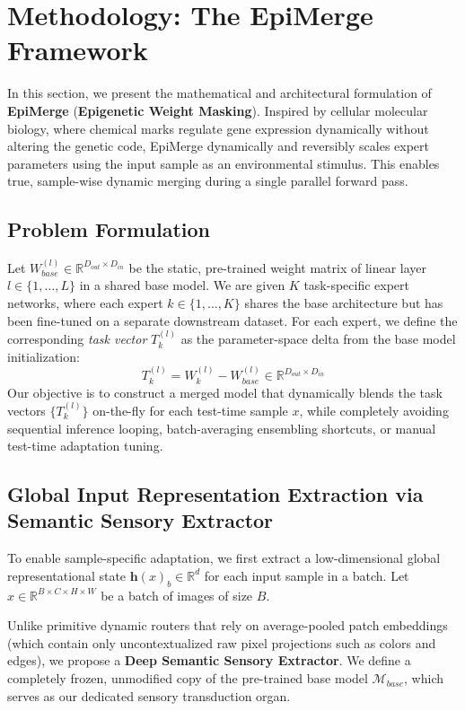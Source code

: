 \section{Methodology: The EpiMerge Framework}
\label{sec:method}

In this section, we present the mathematical and architectural formulation of \textbf{EpiMerge} (\textbf{Epigenetic Weight Masking}). Inspired by cellular molecular biology, where chemical marks regulate gene expression dynamically without altering the genetic code, EpiMerge dynamically and reversibly scales expert parameters using the input sample as an environmental stimulus. This enables true, sample-wise dynamic merging during a single parallel forward pass.

\subsection{Problem Formulation}
Let $W_{base}^{(l)} \in \mathbb{R}^{D_{out} \times D_{in}}$ be the static, pre-trained weight matrix of linear layer $l \in \{1, \dots, L\}$ in a shared base model. We are given $K$ task-specific expert networks, where each expert $k \in \{1, \dots, K\}$ shares the base architecture but has been fine-tuned on a separate downstream dataset. For each expert, we define the corresponding \emph{task vector} $T_k^{(l)}$ as the parameter-space delta from the base model initialization:
\begin{equation}
    T_k^{(l)} = W_k^{(l)} - W_{base}^{(l)} \in \mathbb{R}^{D_{out} \times D_{in}}
\end{equation}
Our objective is to construct a merged model that dynamically blends the task vectors $\{T_k^{(l)}\}$ on-the-fly for each test-time sample $x$, while completely avoiding sequential inference looping, batch-averaging ensembling shortcuts, or manual test-time adaptation tuning.

\subsection{Global Input Representation Extraction via Semantic Sensory Extractor}
To enable sample-specific adaptation, we first extract a low-dimensional global representational state $\mathbf{h}(x)_b \in \mathbb{R}^d$ for each input sample in a batch. Let $x \in \mathbb{R}^{B \times C \times H \times W}$ be a batch of images of size $B$.

Unlike primitive dynamic routers that rely on average-pooled patch embeddings (which contain only uncontextualized raw pixel projections such as colors and edges), we propose a \textbf{Deep Semantic Sensory Extractor}. We define a completely frozen, unmodified copy of the pre-trained base model $\mathcal{M}_{base}$, which serves as our dedicated sensory transduction organ. 

